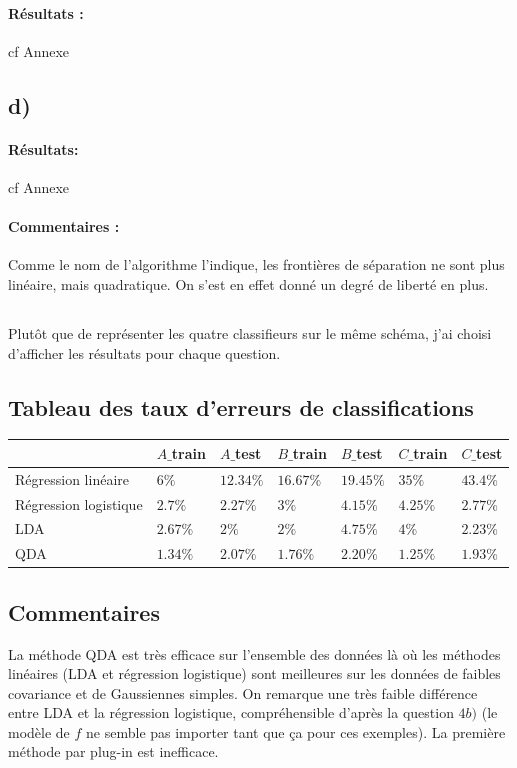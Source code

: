 \documentclass[paper=a4, fontsize=11pt]{article}
\begin{document}
\paragraph{Résultats :}cf Annexe
\subsection*{d)}
\paragraph{Résultats:} cf Annexe
\paragraph{Commentaires :\\} Comme le nom de l'algorithme l'indique, les frontières de séparation ne sont plus linéaire, mais quadratique. On s'est en effet donné un degré de liberté en plus. 

\subsection{} Plutôt que de représenter les quatre classifieurs sur le même schéma, j'ai choisi d'afficher les résultats pour chaque question. 

\subsection{Tableau des taux d'erreurs de classifications} 
\begin{center}
\begin{tabular}{|L{3.5cm}||C{1.5cm}|C{1.5cm}||C{1.5cm}|C{1cm}||C{1.5cm}|C{1.5cm}|}
\hline  & $A\_$train &  $A\_$test &  $B\_$train & $B\_$test & $C\_$train & $C\_$test\\
\hline  Régression linéaire & $6 \%$ & $12.34\%$ & $16.67\%$ & $19.45\%$ & $35\%$ & $43.4\%$  \\
\hline  Régression logistique & $2.7 \%$ & $2.27\%$ & $3\%$ & $4.15\%$ & $4.25\%$ & $2.77\%$ 
\\
\hline  LDA & $2.67 \%$ & $2\%$ & $2\%$ & $4.75\%$ & $4\%$ & $2.23\%$ 
\\
\hline  QDA & $1.34 \%$ & $2.07\%$ & $1.76\%$ & $2.20\%$ & $1.25\%$ & $1.93\%$  \\
\hline
\end{tabular}
\end{center}

\subsection{Commentaires} 
La méthode QDA est très efficace sur l'ensemble des données là où les méthodes linéaires (LDA et régression logistique) sont meilleures sur les données de faibles covariance et de Gaussiennes simples. On remarque une très faible différence entre LDA et la régression logistique, compréhensible d'après la question $4b)$ (le modèle de $f$ ne semble pas importer tant que ça pour ces exemples). La première méthode par plug-in est inefficace. 
\end{document}
